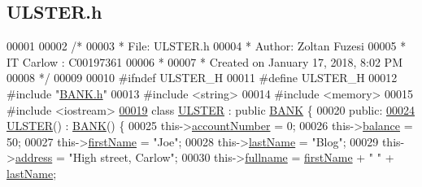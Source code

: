 \hypertarget{_u_l_s_t_e_r_8h_source}{}\subsection{U\+L\+S\+T\+E\+R.\+h}

\begin{DoxyCode}
00001 
00002 \textcolor{comment}{/* }
00003 \textcolor{comment}{ * File:   ULSTER.h}
00004 \textcolor{comment}{ * Author: Zoltan Fuzesi}
00005 \textcolor{comment}{ * IT Carlow : C00197361}
00006 \textcolor{comment}{ *}
00007 \textcolor{comment}{ * Created on January 17, 2018, 8:02 PM}
00008 \textcolor{comment}{ */}
00009 
00010 \textcolor{preprocessor}{#ifndef ULSTER\_H}
00011 \textcolor{preprocessor}{#define ULSTER\_H}
00012 \textcolor{preprocessor}{#include "\hyperlink{_b_a_n_k_8h}{BANK.h}"}
00013 \textcolor{preprocessor}{#include <string>}
00014 \textcolor{preprocessor}{#include <memory>}
00015 \textcolor{preprocessor}{#include <iostream>}
\hypertarget{_u_l_s_t_e_r_8h_source.tex_l00019}{}\hyperlink{class_u_l_s_t_e_r}{00019} \textcolor{keyword}{class }\hyperlink{class_u_l_s_t_e_r}{ULSTER} : \textcolor{keyword}{public} \hyperlink{class_b_a_n_k}{BANK} \{
00020 \textcolor{keyword}{public}:
\hypertarget{_u_l_s_t_e_r_8h_source.tex_l00024}{}\hyperlink{class_u_l_s_t_e_r_a637ad8cb5537167ab51cd079637a8323_a637ad8cb5537167ab51cd079637a8323}{00024}     \hyperlink{class_u_l_s_t_e_r_a637ad8cb5537167ab51cd079637a8323_a637ad8cb5537167ab51cd079637a8323}{ULSTER}() : \hyperlink{class_b_a_n_k}{BANK}() \{
00025         this->\hyperlink{class_u_l_s_t_e_r_a13f0c2ce30f9e66e896633d81c9af979_a13f0c2ce30f9e66e896633d81c9af979}{accountNumber} = 0;
00026         this->\hyperlink{class_u_l_s_t_e_r_af98d3ed41f452b28f26994552465815c_af98d3ed41f452b28f26994552465815c}{balance} = 50;
00027         this->\hyperlink{class_u_l_s_t_e_r_af8d138fdca14b59130b8b4ddd3d73b16_af8d138fdca14b59130b8b4ddd3d73b16}{firstName} = \textcolor{stringliteral}{"Joe"};
00028         this->\hyperlink{class_u_l_s_t_e_r_afa319e559a6a7653aa67e6d8f801d7ee_afa319e559a6a7653aa67e6d8f801d7ee}{lastName} = \textcolor{stringliteral}{"Blog"};
00029         this->\hyperlink{class_u_l_s_t_e_r_a7a13c5988ddafa47b8d6eea3e77fd786_a7a13c5988ddafa47b8d6eea3e77fd786}{address} = \textcolor{stringliteral}{"High street, Carlow"};
00030         this->\hyperlink{class_u_l_s_t_e_r_a5dc42cbd515825463ba31c8d3dcfe1b6_a5dc42cbd515825463ba31c8d3dcfe1b6}{fullname} = \hyperlink{class_u_l_s_t_e_r_af8d138fdca14b59130b8b4ddd3d73b16_af8d138fdca14b59130b8b4ddd3d73b16}{firstName} + \textcolor{stringliteral}{" "} + \hyperlink{class_u_l_s_t_e_r_afa319e559a6a7653aa67e6d8f801d7ee_afa319e559a6a7653aa67e6d8f801d7ee}{lastName};

\end{DoxyCode}
